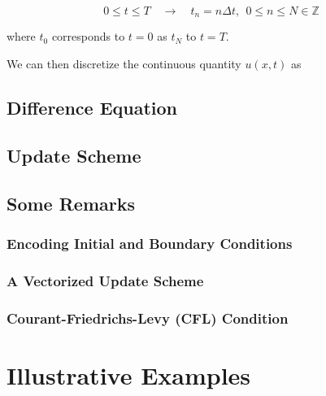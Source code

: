 \documentclass{article}
\begin{document}
\begin{equation*}
   0 \leq t \leq T \quad
   \longrightarrow \quad
   t_{n} = n \Delta t,\ \ 0 \leq n \leq N \in \mathbb{Z}
\end{equation*}

where $t_0$ corresponds to $t=0$ as $t_{N}$ to $t=T$.

We can then discretize the continuous quantity $u \left(x,t\right)$ as 

\lipsum[5]

\subsection{Difference Equation}
\label{subsec: Difference Equation}

\lipsum[42]

\subsection{Update Scheme}
\label{subsec: Update Scheme}

\lipsum[50]

\subsection{Some Remarks}
\label{subsec: Some Remarks}

\lipsum[41]

\subsubsection{Encoding Initial and Boundary Conditions}
\label{subsubsec: Encoding Initial and Boundary Conditions}

\lipsum[94]

\subsubsection{A Vectorized Update Scheme}
\label{subsubsec: A Vectorized Update Scheme}

\lipsum[49]

\subsubsection{Courant-Friedrichs-Levy (CFL) Condition}
\label{subsubsec: Courant-Friedrichs-Levy (CFL) Condition}

\lipsum[29]

\section{Illustrative Examples}
\label{sec: Illustrative Examples}
\end{document}

